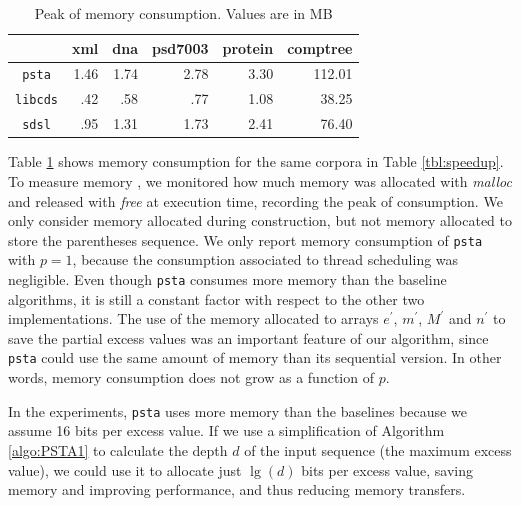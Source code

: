 \begin{table}[ht]
  \centering
  \begin{tabular}{crrrrr}
\hline
    & xml & dna & psd7003 & protein & comptree\\
\hline
 \verb|psta|   &  1.46  &  1.74  & 2.78  &  3.30 & 112.01\\
 \verb|libcds|   &  .42 &  .58 & .77 &  1.08 & 38.25\\
 \verb|sdsl|   &  .95 &  1.31 & 1.73 &  2.41 & 76.40\\
 \hline
\end{tabular}
\caption{Peak of memory consumption. Values are in MB}
\label{tbl:memory_consumption}
\end{table}

Table \ref{tbl:memory_consumption} shows memory consumption for the
same corpora in Table \ref{tbl:speedup}. To measure memory , we
monitored how much memory was allocated with \emph{malloc} and
released with \emph{free} at execution time, recording the peak of
consumption. We only consider memory allocated during construction,
but not memory allocated to store the parentheses sequence. We only
report memory consumption of {\tt psta} with $p=1$, because the
consumption associated to thread scheduling was negligible. Even
though {\tt psta} consumes more memory than the baseline algorithms,
it is still a constant factor with respect to the other two
implementations. The use of the memory allocated to arrays
$e^{\prime}$, $m^{\prime}$, $M^{\prime}$ and $n^{\prime}$ to save the
partial excess values was an important feature of our algorithm, since
{\tt psta} could use the same amount of memory than its sequential
version. In other words, memory consumption does not grow as a
function of $p$.

In the experiments, {\tt psta} uses more memory than the baselines
because we assume 16 bits per excess value. If we use a simplification
of Algorithm \ref{algo:PSTA1} to calculate the depth $d$ of the input
sequence (the maximum excess value), we could use it to allocate just
$\lg (d)$ bits per excess value, saving memory and improving
performance, and thus reducing memory transfers.














